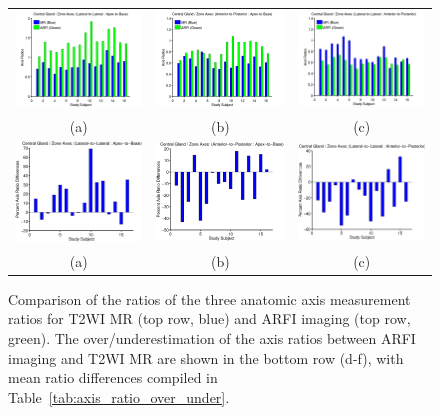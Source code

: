 \begin{figure}[htb!]
\centering
\begin{tabular}{ccc}
\includegraphics[width=0.3\linewidth]{figs/mr_arfi_central_axes1} &
\includegraphics[width=0.3\linewidth]{figs/mr_arfi_central_axes2} &
\includegraphics[width=0.3\linewidth]{figs/mr_arfi_central_axes3} \\
(a) & (b) & (c) \\
\includegraphics[width=0.3\linewidth]{figs/mr_arfi_central_over_under1.eps} &
\includegraphics[width=0.3\linewidth]{figs/mr_arfi_central_over_under2.eps} &
\includegraphics[width=0.3\linewidth]{figs/mr_arfi_central_over_under3.eps} \\
(a) & (b) & (c) \\
\end{tabular}
\caption{Comparison of the ratios of the three anatomic axis measurement ratios
    for T2WI MR (top row, blue) and ARFI imaging (top row, green).  The
    over/underestimation of the axis ratios between ARFI imaging and T2WI MR
    are shown in the bottom row (d-f), with mean ratio differences compiled in
    Table~\ref{tab:axis_ratio_over_under}.}
\label{fig:mr_arfi_central_axes} 
\end{figure}
